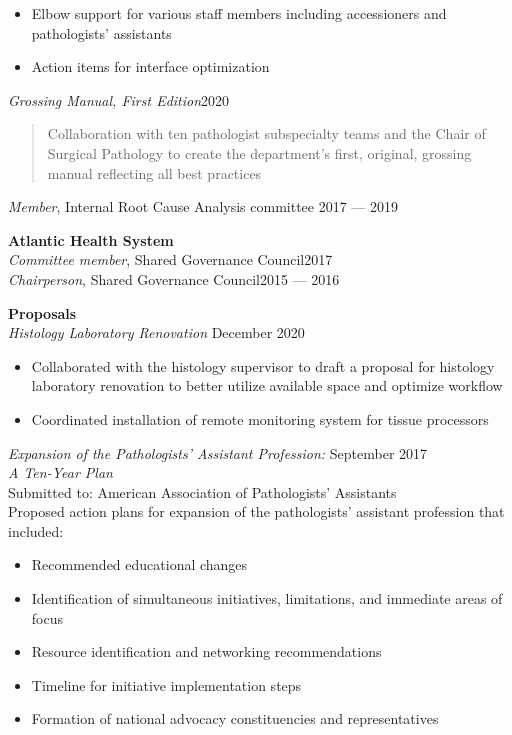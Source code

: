 \documentclass[margin]{res}
\begin{document}
\begin{resume}
\begin{itemize}
\begin{quote}
\begin{itemize}
\end{itemize}
\end{quote}
\item Elbow support for various staff members including accessioners and pathologists’ assistants
\item Action items for interface optimization
\end{itemize}
\emph{Grossing Manual, First Edition}\hfill 2020
\begin{quote}
    Collaboration with ten pathologist subspecialty teams and the Chair of Surgical Pathology to create the department’s first, original, grossing manual reflecting all best practices
\end{quote}
\emph{Member}, Internal Root Cause Analysis committee \hfill 2017 --- 2019
\par
\textbf{Atlantic Health System} \\
\emph{Committee member}, Shared Governance Council\hfill 2017\\
\emph{Chairperson}, Shared Governance Council\hfill 2015 --- 2016
\par

\textbf{Proposals}\\
\emph{Histology Laboratory Renovation} \hfill December 2020
\begin{itemize}
    \item  Collaborated with the histology supervisor to draft a proposal for histology \\laboratory renovation to better utilize available space and optimize workflow
    \item Coordinated installation of remote monitoring system for tissue processors
\end{itemize}

\pagebreak

\emph{Expansion of the Pathologists’ Assistant Profession:} \hfill September 2017\\
\emph{ A Ten-Year Plan}\\
Submitted to: American Association of Pathologists’ Assistants\\
Proposed action plans for expansion of the pathologists’ assistant profession that\\included:
\begin{itemize}
\item Recommended educational changes
\item Identification of simultaneous initiatives, limitations, and immediate areas of \\focus 
\item Resource identification and networking recommendations
\item Timeline for initiative implementation steps
\item Formation of national advocacy constituencies and representatives


\end{itemize}
\end{resume}
\end{document}
